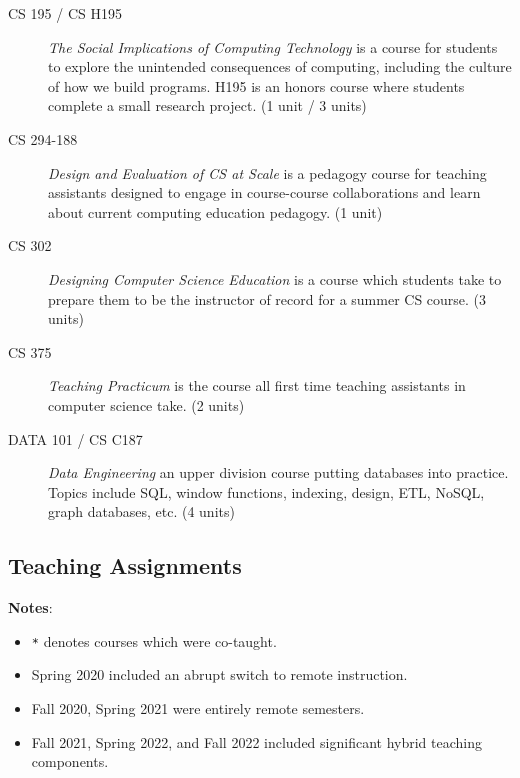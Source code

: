 \begin{description}
    \item[CS 195 / CS H195] \textit{The Social Implications of Computing Technology} is a course for students to explore the unintended consequences of computing, including the culture of how we build programs. H195 is an honors course where students complete a small research project. (1 unit / 3 units)
    
    \item[CS 294-188] \textit{Design and Evaluation of CS at Scale} is a pedagogy course for teaching assistants designed to engage in course-course collaborations and learn about current computing education pedagogy.  (1 unit)
    
    \item[CS 302] \textit{Designing Computer Science Education} is a course which students take to prepare them to be the instructor of record for a summer CS course. (3 units)
    
    \item[CS 375] \textit{Teaching Practicum} is the course all first time teaching assistants in computer science take. (2 units)

    \item[DATA 101 / CS C187] \textit{Data Engineering} an upper division course putting databases into practice. Topics include SQL, window functions, indexing, design, ETL, NoSQL, graph databases, etc. (4 units)
\end{description}

\vspace{5pt}

\subsection{Teaching Assignments}

\textbf{Notes}:
\begin{itemize}
    \item \texttt{*} denotes courses which were co-taught.
    \item Spring 2020 included an abrupt switch to remote instruction.
    \item Fall 2020, Spring 2021 were entirely remote semesters.
    \item Fall 2021, Spring 2022, and Fall 2022 included significant hybrid teaching components.
\newline

\end{itemize}

\newcommand{\semester}[2]{\item{\textbf{#1}\newline}#2}


